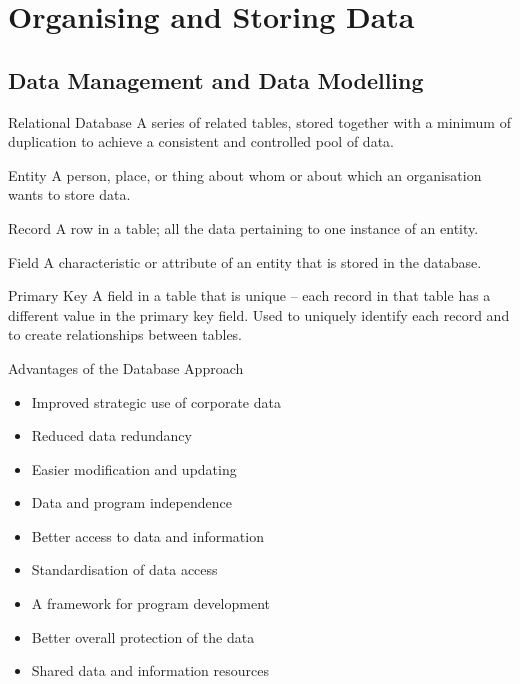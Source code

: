 \documentclass[\main/notes.tex]{subfiles}
\begin{document}
	\setcounter{chapter}{4}
	\chapter{Organising and Storing Data}
		\section{Data Management and Data Modelling}
			\begin{definition}{Relational Database}
				A series of related tables, stored together with a minimum of duplication to achieve a consistent and controlled pool of data.
			\end{definition}
			\begin{definition}{Entity}
				A person, place, or thing about whom or about which an organisation wants to store data.
			\end{definition}
			\begin{definition}{Record}
				A row in a table; all the data pertaining to one instance of an entity.
			\end{definition}
			\begin{definition}{Field}
				A characteristic or attribute of an entity that is stored in the database.
			\end{definition}
			\begin{definition}{Primary Key}
				A field in a table that is unique -- each record in that table has a different value in the primary key field. Used to uniquely identify each record and to create relationships between tables.
			\end{definition}
			\begin{sidenote}{Advantages of the Database Approach}
				\begin{multicols}{2}
					\begin{itemize}[nosep]
						\item Improved strategic use of corporate data
						\item Reduced data redundancy
						\item Easier modification and updating
						\item Data and program independence
						\item Better access to data and information
						\item Standardisation of data access
						\item A framework for program development
						\item Better overall protection of the data
						\item Shared data and information resources
					\end{itemize}
				\end{multicols}
			\end{sidenote}
\end{document}
